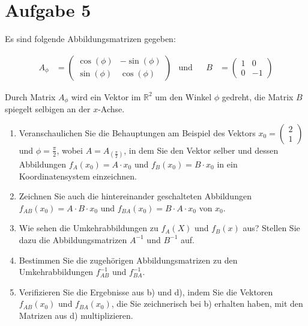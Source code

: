\documentclass[main.tex]{subfiles}
\begin{document}
\section{Aufgabe 5}
Es sind folgende Abbildungsmatrizen gegeben:

\begin{align*}
    A_\phi &= \begin{pmatrix}
        \cos (\phi) & -\sin (\phi) \\
        \sin (\phi) & \cos (\phi)
    \end{pmatrix}
    &\text{und} & &
    B &= \begin{pmatrix}
        1 &  0 \\
        0 & -1
    \end{pmatrix}
\end{align*}

Durch Matrix $A_\phi$ wird ein Vektor im $\mathbb{R}^2$ um den Winkel $\phi$ gedreht, die Matrix $B$ spiegelt selbigen an der $x$-Achse.

\begin{enumerate}
    \item Veranschaulichen Sie die Behauptungen am Beispiel des Vektors $x_0 = \begin{pmatrix}2 \\ 1 \end{pmatrix}$ und $\phi = \frac{\pi}{2}$, wobei $A=A_{\left(\frac{\pi}{2}\right)}$, in dem Sie den Vektor selber und dessen Abbildungen $f_A(x_0) = A\cdot x_0$ und $f_B(x_0) = B\cdot x_0$ in ein Koordinatensystem einzeichnen.
    \item Zeichnen Sie auch die hintereinander geschalteten Abbildungen $f_{AB}(x_0) = A\cdot B\cdot x_0$ und $f_{BA}(x_0) = B\cdot A\cdot x_0$ von $x_0$.
    \item Wie sehen die Umkehrabbildungen zu $f_A(X)$ und $f_B(x)$ aus? Stellen Sie dazu die Abbildungsmatrizen $A^{-1}$ und $B^{-1}$ auf.
    \item Bestimmen Sie die zugehörigen Abbildungsmatrizen zu den Umkehrabbildungen $f^{-1}_{AB}$ und $f^{-1}_{BA}$.
    \item Verifizieren Sie die Ergebnisse aus b) und d), indem Sie die Vektoren $f_{AB}(x_0)$ und $f_{BA}(x_0)$, die Sie zeichnerisch bei b) erhalten haben, mit den Matrizen aus d) multiplizieren.
\end{enumerate}
\end{document}
